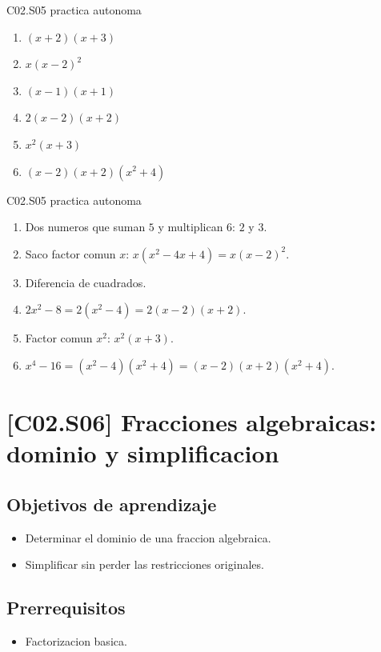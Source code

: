 \begin{shortanswer}{C02.S05 practica autonoma}
\begin{enumerate}[label=\textbf{PX-C02.S05-\arabic*:}, leftmargin=*]
  \item \((x+2)(x+3)\)
  \item \(x(x-2)^2\)
  \item \((x-1)(x+1)\)
  \item \(2(x-2)(x+2)\)
  \item \(x^2(x+3)\)
  \item \((x-2)(x+2)(x^2+4)\)
\end{enumerate}
\end{shortanswer}

\begin{fullsolution}{C02.S05 practica autonoma}
\begin{enumerate}[label=\textbf{PX-C02.S05-\arabic*:}, leftmargin=*]
  \item Dos numeros que suman \(5\) y multiplican \(6\): \(2\) y \(3\).
  \item Saco factor comun \(x\): \(x(x^2-4x+4)=x(x-2)^2\).
  \item Diferencia de cuadrados.
  \item \(2x^2-8=2(x^2-4)=2(x-2)(x+2)\).
  \item Factor comun \(x^2\): \(x^2(x+3)\).
  \item \(x^4-16=(x^2-4)(x^2+4)=(x-2)(x+2)(x^2+4)\).
\end{enumerate}
\end{fullsolution}

\section{[C02.S06] Fracciones algebraicas: dominio y simplificacion}

\subsection*{Objetivos de aprendizaje}
\begin{itemize}
  \item Determinar el dominio de una fraccion algebraica.
  \item Simplificar sin perder las restricciones originales.
\end{itemize}

\subsection*{Prerrequisitos}
\begin{itemize}
  \item Factorizacion basica.
\end{itemize}

